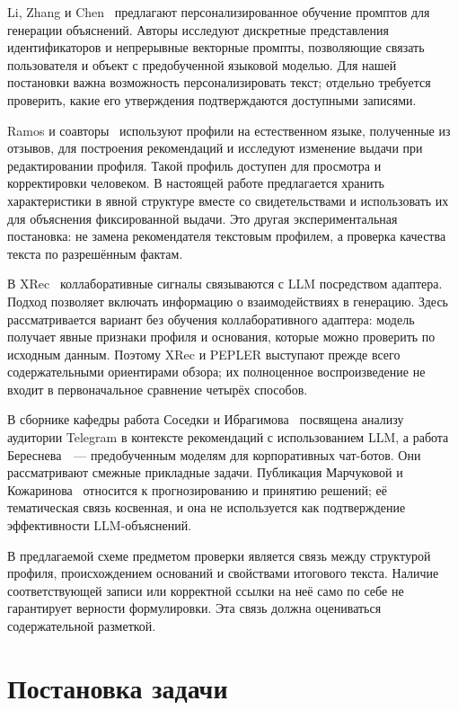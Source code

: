 \documentclass{misisarticle}
\begin{document}
Li, Zhang и Chen~\cite{pepler} предлагают персонализированное обучение промптов для генерации объяснений. Авторы исследуют дискретные представления идентификаторов и непрерывные векторные промпты, позволяющие связать пользователя и объект с предобученной языковой моделью. Для нашей постановки важна возможность персонализировать текст; отдельно требуется проверить, какие его утверждения подтверждаются доступными записями.

Ramos и соавторы~\cite{upr} используют профили на естественном языке, полученные из отзывов, для построения рекомендаций и исследуют изменение выдачи при редактировании профиля. Такой профиль доступен для просмотра и корректировки человеком. В настоящей работе предлагается хранить характеристики в явной структуре вместе со свидетельствами и использовать их для объяснения фиксированной выдачи. Это другая экспериментальная постановка: не замена рекомендателя текстовым профилем, а проверка качества текста по разрешённым фактам.

В XRec~\cite{xrec} коллаборативные сигналы связываются с LLM посредством адаптера. Подход позволяет включать информацию о взаимодействиях в генерацию. Здесь рассматривается вариант без обучения коллаборативного адаптера: модель получает явные признаки профиля и основания, которые можно проверить по исходным данным. Поэтому XRec и PEPLER выступают прежде всего содержательными ориентирами обзора; их полноценное воспроизведение не входит в первоначальное сравнение четырёх способов.

В сборнике кафедры работа Соседки и Ибрагимова~\cite{sosedka} посвящена анализу аудитории Telegram в контексте рекомендаций с использованием LLM, а работа Береснева~\cite{beresnev}~--- предобученным моделям для корпоративных чат-ботов. Они рассматривают смежные прикладные задачи. Публикация Марчуковой и Кожаринова~\cite{kozharinov} относится к прогнозированию и принятию решений; её тематическая связь косвенная, и она не используется как подтверждение эффективности LLM-объяснений.

В предлагаемой схеме предметом проверки является связь между структурой профиля, происхождением оснований и свойствами итогового текста. Наличие соответствующей записи или корректной ссылки на неё само по себе не гарантирует верности формулировки. Эта связь должна оцениваться содержательной разметкой.

\section{Постановка задачи}
\end{document}
